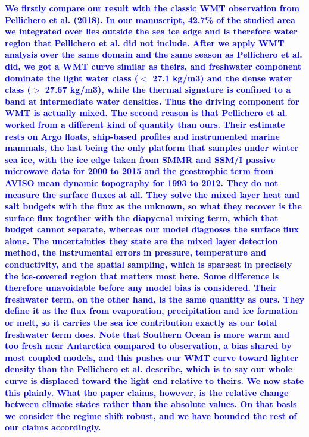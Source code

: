 \documentclass[pdflatex,sn-nature]{sn-jnl}
\begin{document}
\noindent\textcolor{blue}{\textbf{We firstly compare our result with the classic WMT observation from Pellichero et al. (2018). In our manuscript, 42.7\% of the studied area we integrated over lies outside the sea ice edge and is therefore water region that Pellichero et al. did not include. After we apply WMT analysis over the same domain and the same season as Pellichero et al. did, we got a WMT curve similar as theirs, and freshwater component dominate the light water class ($<$ 27.1 kg/m3) and the dense water class ($>$ 27.67 kg/m3), while the thermal signature is confined to a band at intermediate water densities. Thus the driving component for WMT is actually mixed. The second reason is that Pellichero et al. worked from a different kind of quantity than ours. Their estimate rests on Argo floats, ship-based profiles and instrumented marine mammals, the last being the only platform that samples under winter sea ice, with the ice edge taken from SMMR and SSM/I passive microwave data for 2000 to 2015 and the geostrophic term from AVISO mean dynamic topography for 1993 to 2012. They do not measure the surface fluxes at all. They solve the mixed layer heat and salt budgets with the flux as the unknown, so what they recover is the surface flux together with the diapycnal mixing term, which that budget cannot separate, whereas our model diagnoses the surface flux alone. The uncertainties they state are the mixed layer detection method, the instrumental errors in pressure, temperature and conductivity, and the spatial sampling, which is sparsest in precisely the ice-covered region that matters most here. Some difference is therefore unavoidable before any model bias is considered. Their freshwater term, on the other hand, is the same quantity as ours. They define it as the flux from evaporation, precipitation and ice formation or melt, so it carries the sea ice contribution exactly as our total freshwater term does. Note that Southern Ocean is more warm and too fresh near Antarctica compared to observation, a bias shared by most coupled models, and this pushes our WMT curve toward lighter density than the Pellichero et al. describe, which is to say our whole curve is displaced toward the light end relative to theirs. We now state this plainly. What the paper claims, however, is the relative change between climate states rather than the absolute values. On that basis we consider the regime shift robust, and we have bounded the rest of our claims accordingly.}}
\end{document}

